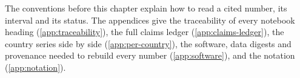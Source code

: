 The conventions before this chapter explain how to read a cited number, its interval and its status. The appendices
give the traceability of every notebook heading (\cref{app:traceability}), the full claims ledger
(\cref{app:claims-ledger}), the country series side by side (\cref{app:per-country}), the software, data digests and
provenance needed to rebuild every number (\cref{app:software}), and the notation (\cref{app:notation}).
